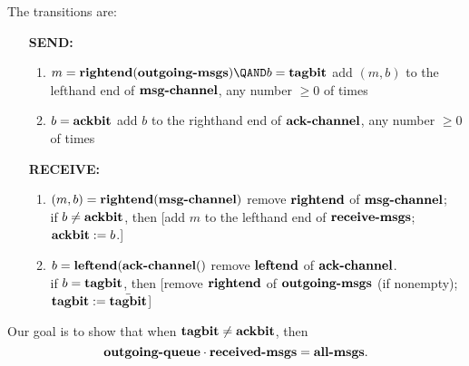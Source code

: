 The transitions are:
\begin{enumerate}
\item[\textbf{SEND:}]

\begin{enumerate}
\item
{}
{%
   $m = \text{\textbf{rightend}}(\text{\textbf{outgoing-msgs}}) \QAND
   b = \text{\textbf{tagbit}}$}
{%
   add $(m,b)$ to the lefthand end of $\text{\textbf{msg-channel}}$,
   any number $\geq 0$ of times}

\item
{}
{%
   $b = \text{\textbf{ackbit}}$}
{%
   add $b$ to the righthand end of $\text{\textbf{ack-channel}}$,
   any number $\geq 0$ of times}
\end{enumerate}

\item[\textbf{RECEIVE:}]

\begin{enumerate}
\item
{}
 {%
   $(m,b) = \text{\textbf{rightend}}(\text{\textbf{msg-channel}})$}
{%
   remove $\text{\textbf{rightend}}$ of $\text{\textbf{msg-channel}}$;\\
   if $b \neq \text{\textbf{ackbit}}$, then
   [add $m$ to the lefthand end of $\text{\textbf{receive-msgs}}$;
   $\text{\textbf{ackbit}} := b$.]}

\item {}
{%
   $b = \text{\textbf{leftend}}(\text{\textbf{ack-channel}}()$}
{%
   remove $\text{\textbf{leftend}}$ of $\text{\textbf{ack-channel}}$.\\
   if $b = \text{\textbf{tagbit}}$, then
   [remove $\text{\textbf{rightend}}$ of $\text{\textbf{outgoing-msgs}}$ (if nonempty);
   $\text{\textbf{tagbit}} := \bar{\text{\textbf{tagbit}}}$]}
\end{enumerate}

\end{enumerate}

Our goal is to show that when $\text{\textbf{tagbit}} \neq
\text{\textbf{ackbit}}$, then\\
\begin{equation}\label{all-msgs-preserved}
\text{\textbf{outgoing-queue}}\cdot \text{\textbf{received-msgs}} =
\text{\textbf{all-msgs}}.
\end{equation}

